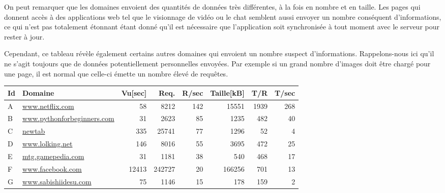 			On peut remarquer que les domaines envoient des quantités de données très différentes, à la fois en nombre et en taille. Les pages qui donnent accès à des applications web tel que le visionnage de vidéo ou le chat semblent aussi envoyer un nombre conséquent d'informations, ce qui n'est pas totalement étonnant étant donné qu'il est nécessaire que l'application soit synchronisée à tout moment avec le serveur pour rester à jour.

			Cependant, ce tableau révèle également certains autres domaines qui envoient un nombre suspect d'informations. Rappelons-nous ici qu'il ne s'agit toujours que de données potentiellement personnelles envoyées. Par exemple si un grand nombre d'images doit être chargé pour une page, il est normal que celle-ci émette un nombre élevé de requêtes.

			\begin{table}[]
\centering
\begin{tabular}{llrrrrrr}
\textbf{Id} & \textbf{Domaine}           & \textbf{Vu{[}sec{]}} & \textbf{Req.} & \textbf{R/sec} & \textbf{Taille{[}kB{]}} & \textbf{T/R} & \textbf{T/sec} \\ \hline
A & \scriptsize \url{www.netflix.com}            & 58                    & 8212          & 142                  & 15551                    & 1939         & 268            \\
B & \scriptsize \url{www.pythonforbeginners.com} & 31                    & 2623          & 85                   & 1235                     & 482          & 40             \\
C & \scriptsize \url{newtab}                     & 335                   & 25741         & 77                   & 1296                     & 52           & 4              \\
D & \scriptsize \url{www.lolking.net}            & 146                   & 8016          & 55                   & 3695                     & 472          & 25             \\
E & \scriptsize \url{mtg.gamepedia.com}          & 31                    & 1181          & 38                   & 540                      & 468          & 17             \\
F & \scriptsize \url{www.facebook.com}           & 12413                 & 242727        & 20                   & 166256                   & 701          & 13             \\
G & \scriptsize \url{www.sabishiidesu.com}       & 75                    & 1146          & 15                   & 178                      & 159          & 2              \\

\end{tabular}
\end{table}
